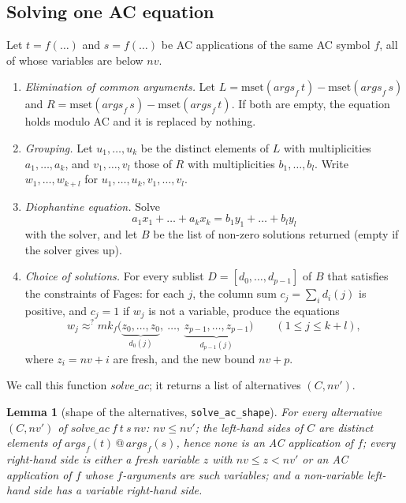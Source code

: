 \documentclass[11pt,a4paper]{article}
\newtheorem{lemma}[theorem]{Lemma}
\theoremstyle{definition}
\theoremstyle{remark}
\newcommand{\isa}[1]{\mbox{\small\texttt{#1}}}
\newcommand{\args}{\mathit{args}}
\newcommand{\mkac}{\mathit{mk}}
\begin{document}
\subsection{Solving one AC equation}

Let $t = f(\dots)$ and $s = f(\dots)$ be AC applications of the same AC symbol $f$, all of whose
variables are below $\mathit{nv}$.

\begin{enumerate}[leftmargin=*]
  \item \emph{Elimination of common arguments.} Let $L = \mathrm{mset}(\args_f\,t) -
        \mathrm{mset}(\args_f\,s)$ and $R = \mathrm{mset}(\args_f\,s) - \mathrm{mset}(\args_f\,t)$.
        If both are empty, the equation holds modulo AC and it is replaced by nothing.
  \item \emph{Grouping.} Let $u_1,\dots,u_k$ be the distinct elements of $L$ with multiplicities
        $a_1,\dots,a_k$, and $v_1,\dots,v_l$ those of $R$ with multiplicities $b_1,\dots,b_l$.
        Write $w_1,\dots,w_{k+l}$ for $u_1,\dots,u_k,v_1,\dots,v_l$.
  \item \emph{Diophantine equation.} Solve
        \[ a_1x_1 + \dots + a_kx_k = b_1y_1 + \dots + b_ly_l \]
        with the solver, and let $B$ be the list of non-zero solutions returned (empty if the
        solver gives up).
  \item \emph{Choice of solutions.} For every sublist $D = [d_0,\dots,d_{p-1}]$ of $B$ that
        satisfies the constraints of Fages: for each $j$, the column sum
        $c_j = \sum_i d_i(j)$ is positive, and $c_j = 1$ if $w_j$ is not a variable, produce
        the equations
        \[
          w_j \approx^? \mkac_f\bigl(\underbrace{z_0,\dots,z_0}_{d_0(j)},\ \dots,\
          \underbrace{z_{p-1},\dots,z_{p-1}}_{d_{p-1}(j)}\bigr)
          \qquad (1 \le j \le k+l),
        \]
        where $z_i = \mathit{nv} + i$ are fresh, and the new bound $\mathit{nv} + p$.
\end{enumerate}

We call this function $\mathit{solve\_ac}$; it returns a list of alternatives $(C, \mathit{nv}')$.

\begin{lemma}[shape of the alternatives, \isa{solve\_ac\_shape}]\label{lem:shape}
  For every alternative $(C, \mathit{nv}')$ of $\mathit{solve\_ac}\ f\ t\ s\ \mathit{nv}$:
  $\mathit{nv} \le \mathit{nv}'$; the left-hand sides of $C$ are distinct elements of
  $\args_f(t) \mathbin{@} \args_f(s)$, hence none is an AC application of $f$; every right-hand
  side is either a fresh variable $z$ with $\mathit{nv} \le z < \mathit{nv}'$ or an AC application
  of $f$ whose $f$-arguments are such variables; and a non-variable left-hand side has a variable
  right-hand side.
\end{lemma}
\end{document}
